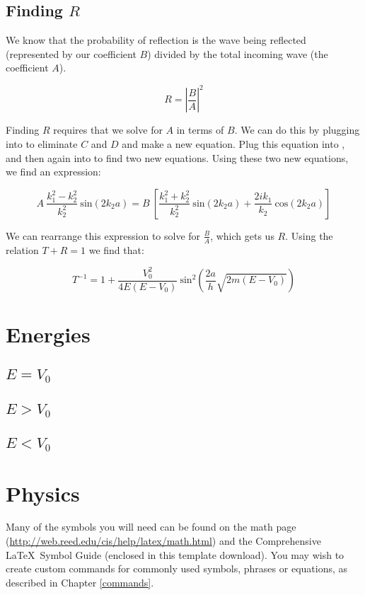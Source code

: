 \subsection{Finding $R$}

We know that the probability of reflection is the wave being reflected (represented by our coefficient $B$) divided by the total incoming wave (the coefficient $A$).

$$R = |\frac{B}{A}|^2$$

Finding $R$ requires that we solve for $A$ in terms of $B$. We can do this by plugging  into  to eliminate $C$ and $D$ and make a new equation. Plug this equation into , and then again into  to find two new equations. Using these two new equations, we find an expression: 

$$ A~\frac{k_1^2-k_2^2}{k_2^2}~\mathrm{sin}(2k_2a) = B~[\frac{k_1^2+k_2^2}{k_2^2}~\mathrm{sin}(2k_2a) + \frac{2 i k_1}{k_2}~\mathrm{cos}(2k_2a)]$$

We can rearrange this expression to solve for $\frac{B}{A}$, which gets us $R$. Using the relation $T + R = 1$ we find that:

$$T^{-1} = 1 + \frac{V_0^2}{4 E (E - V_0)}~\mathrm{sin}^2\left(\frac{2 a}{h} \sqrt{2 m (E - V_0)}\right)$$

\section{Energies}
    \subsection{$E = V_0$}
    \subsection{$E > V_0$}
    \subsection{$E < V_0$}
    
    
    
    
\section{Physics}

Many of the symbols you will need can be found on the math page (\url{http://web.reed.edu/cis/help/latex/math.html}) and the Comprehensive \LaTeX\ Symbol Guide (enclosed in this template download).  You may wish to create custom commands for commonly used symbols, phrases or equations, as described in Chapter \ref{commands}.
